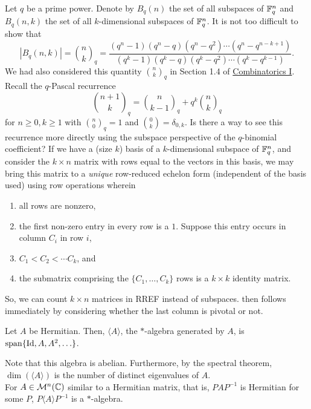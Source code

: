 	Let $q$ be a prime power. Denote by $B_q(n)$ the set of all subspaces of $\mathbb{F}_q^n$ and $B_q(n,k)$ the set of all $k$-dimensional subspaces of $\mathbb{F}_q^n$. It is not too difficult to show that
	\[ |B_q(n,k)| = \binom{n}{k}_q = \frac{(q^n-1)(q^n-q)(q^n-q^2)\cdots(q^n-q^{n-k+1})}{(q^k-1)(q^k-q)(q^k-q^2)\cdots(q^k-q^{k-1})}. \]
	We had also considered this quantity $\binom{n}{k}_q$ in Section 1.4 of \href{https://amitrajaraman.github.io/notes/ma-861/main.pdf}{Combinatorics I}. Recall the $q$-Pascal recurrence
	\begin{equation}
		\label{eqn: q-pascal}
		\binom{n+1}{k}_q = \binom{n}{k-1}_q + q^k \binom{n}{k}_q
	\end{equation}
	for $n\ge 0, k \ge 1$ with $\binom{n}{0}_q = 1$ and $\binom{0}{k} = \delta_{0,k}$. Is there a way to see this recurrence more directly using the subspace perspective of the $q$-binomial coefficient? If we have a (size $k$) basis of a $k$-dimensional subspace of $\mathbb{F}_q^n$, and consider the $k \times n$ matrix with rows equal to the vectors in this basis, we may bring this matrix to a \emph{unique} row-reduced echelon form (independent of the basis used) using row operations wherein
	\begin{enumerate}[label=(\roman*)]
		\item all rows are nonzero,
		\item the first non-zero entry in every row is a $1$. Suppose this entry occurs in column $C_i$ in row $i$,
		\item $C_1 < C_2 < \cdots C_k$, and
		\item the submatrix comprising the $\{C_1,\ldots,C_k\}$ rows is a $k \times k$ identity matrix.
	\end{enumerate}
	So, we can count $k \times n$ matrices in RREF instead of subspaces.  then follows immediately by considering whether the last column is pivotal or not.

	\begin{fdef}
		Let $A$ be Hermitian. Then, $\langle A\rangle$, the $*$-algebra generated by $A$, is $\operatorname{span}\{\operatorname{Id},A,A^2,\ldots\}$.
	\end{fdef}

	Note that this algebra is abelian. Furthermore, by the spectral theorem, $\dim(\langle A\rangle)$ is the number of distinct eigenvalues of $A$.\\ %

	For $A \in \mathcal{M}^n(\mathbb{C})$ similar to a Hermitian matrix, that is, $PAP^{-1}$ is Hermitian for some $P$, $P\langle A\rangle P^{-1}$ is a $*$-algebra.
	
